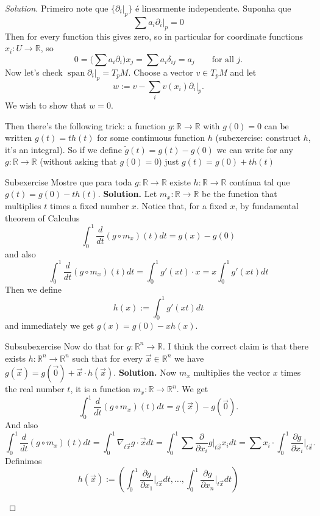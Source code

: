 \begin{proof}[Solution]\leavevmode
Primeiro note que \(\{\partial_i|_{p}\}\) é linearmente independente. Suponha que 
\[\sum a_i \partial_i|_{p} =0\]
Then for every function this gives zero, so in particular for coordinate functions \(x_i:U \to \mathbb{R}\), so
\[0=\Big(\sum a_i \partial_i\Big)x_j=\sum a_i \delta_{ij}=a_j\qquad \text{for all \(j\).} \]
Now let's check \(\operatorname{span}\partial_i|_{p}=T_pM\). Choose a vector \(v \in T_pM\) and let
\[w:=v-\sum_{i}v(x_i)\partial_i|_{p}.\]
We wish to show that \(w=0\).

Then there's the following trick: a function \(g:\mathbb{R} \to \mathbb{R}\) with \(g(0)=0\) can be written \(g(t)=th(t)\) for some continuous function \(h\) (subexercise: construct \(h\), it's an integral). So if we define \(\tilde{g}(t)=g(t)-g(0)\) we can write for any \(g: \mathbb{R} \to \mathbb{R}\) (without asking that \(g(0)=0\)) just \(g(t)=g(0)+th(t)\)

\begin{thing6}{Subexercise}\leavevmode
Mostre que para toda \(g:\mathbb{R} \to \mathbb{R}\) existe \(h: \mathbb{R} \to \mathbb{R}\) contínua tal que \(g(t)=g(0)-th(t)\). \textbf{Solution.} Let \(m_x:\mathbb{R} \to \mathbb{R}\) be the function that multiplies \(t\) times a fixed number \(x\). Notice that, for a fixed \(x\), by fundamental theorem of Calculus
\[\int_0^1\frac{d}{dt}(g \circ m_x)(t)dt=g(x)-g(0)\]
and also
\[\int_0^1\frac{d}{dt}(g \circ m_x)(t)dt=\int_0^1 g'(xt)\cdot x=x \int_0^1 g'(xt)dt\]
Then we define
\[h(x):=\int_0^1g'(xt)dt\]
and immediately we get \(g(x)=g(0)-xh(x)\).
\end{thing6}
\begin{thing6}{Subsubexercise}\leavevmode
	Now do that for \(g:\mathbb{R}^n\to \mathbb{R}\). I think the correct claim is that there exists \(h:\mathbb{R}^n\to \mathbb{R}^n\) such that for every \(\vec{x} \in \mathbb{R}^n\) we have \(g(\vec{x})=g(\vec{0})+\vec{x}\cdot h(\vec{x})\). \textbf{Solution.} Now \(m_x\) multiplies the vector \(x\) times the real number \(t\), it is a function \(m_x: \mathbb{R}\to \mathbb{R}^n\). We get
\[\int_0^1 \frac{d}{dt}(g \circ m_x)(t)dt=g(\vec{x})-g(\vec{0}).\]
And also
\[\int_0^1 \frac{d}{dt}(g \circ m_x)(t)dt=\int_0^1 \nabla_{t \vec{x}} g\cdot \vec{x} dt=\int_0^1 \sum \frac{\partial }{\partial x_i}g\Big|_{t\vec{x}}x_i dt=\sum x_i \cdot  \int_0^1 \frac{\partial g}{\partial x_i}\Big|_{t \vec{x}}.\]
Definimos
\[h(\vec{x}):=\left(\int_0^1 \frac{\partial g}{\partial x_1}\Big|_{t \vec{x}}dt, \ldots , \int_0^1 \frac{\partial g}{\partial x_n}\Big|_{t \vec{x}}dt\right) \]
\end{thing6}


\end{proof}
